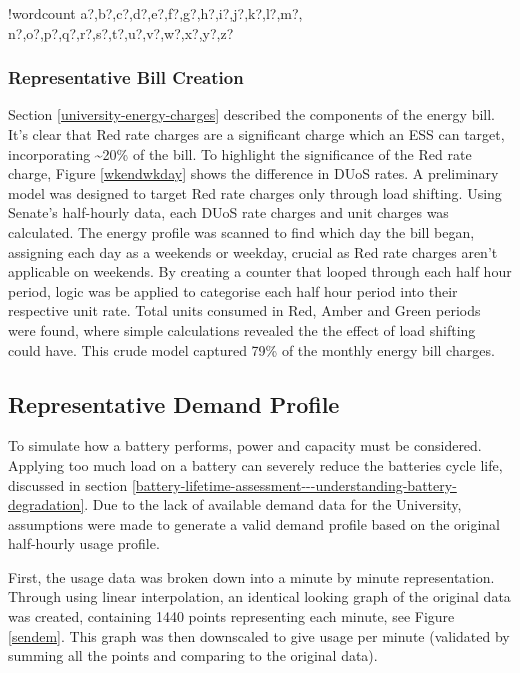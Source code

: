 \documentclass[fontsize=9.5pt]{extarticle}
\numberwithin{figure}{section} %
\newcounter{words}
\newenvironment{counted}{%
  \setcounter{words}{0}
  \SearchList!{wordcount}{\stepcounter{words}}
    {a?,b?,c?,d?,e?,f?,g?,h?,i?,j?,k?,l?,m?,
    n?,o?,p?,q?,r?,s?,t?,u?,v?,w?,x?,y?,z?}
  \UndoBoundary{'}
  \SearchOrder{p;}}{%
  \StopSearching}
\begin{document}
\begin{counted}
\subsubsection{Representative Bill
Creation}\label{representative-bill-creation}

Section \ref{university-energy-charges} described the components of the
energy bill. It's clear that Red rate charges are a significant charge
which an ESS can target, incorporating \textasciitilde{}20\% of the
bill. To highlight the significance of the Red rate charge, Figure
\ref{wkendwkday} shows the difference in DUoS rates. A preliminary model
was designed to target Red rate charges only through load shifting.
Using Senate's half-hourly data, each DUoS rate charges and unit charges
was calculated. The energy profile was scanned to find which day the
bill began, assigning each day as a weekends or weekday, crucial as Red
rate charges aren't applicable on weekends. By creating a counter that
looped through each half hour period, logic was be applied to categorise
each half hour period into their respective unit rate. Total units
consumed in Red, Amber and Green periods were found, where simple
calculations revealed the the effect of load shifting could have. This
crude model captured 79\% of the monthly energy bill charges.

\subsection{Representative Demand
Profile}\label{representative-demand-profile}

To simulate how a battery performs, power and capacity must be
considered. Applying too much load on a battery can severely reduce the
batteries cycle life, discussed in section
\ref{battery-lifetime-assessment---understanding-battery-degradation}.
Due to the lack of available demand data for the University, assumptions
were made to generate a valid demand profile based on the original
half-hourly usage profile.

First, the usage data was broken down into a minute by minute
representation. Through using linear interpolation, an identical looking
graph of the original data was created, containing 1440 points
representing each minute, see Figure \ref{sendem}. This graph was then
downscaled to give usage per minute (validated by summing all the points
and comparing to the original data).


\end{counted}
\end{document}
